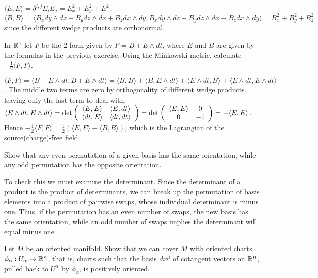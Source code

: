 $\langle E,E\rangle=\delta^{i,j}E_i E_j=E_x^2+E_y^2+E_z^2$.  $\langle B,B\rangle=\langle B_x dy\wedge dz+B_y dz\wedge dx+B_z dx\wedge dy,
B_x dy\wedge dz+B_y dz\wedge dx+B_z dx\wedge dy\rangle= B_x^2+B_y^2+B_z^2$ since the different wedge products are orthonormal.\\

\begin{p}{In $\mathbb{R}^4$ let $F$ be the 2-form given by $F=B+E\wedge dt$, where $E$ and $B$ are given by the formulas
in the previous exercise. Using the Minkowski metric, calculate $-\frac{1}{2}\langle F,F\rangle$.}\end{p}

$\langle F,F\rangle=\langle B+E\wedge dt,B+E\wedge dt\rangle=\langle B,B\rangle+\langle B,E\wedge dt\rangle+\langle E\wedge dt,B\rangle
+\langle E\wedge dt,E\wedge dt\rangle$. The middle two terms are zero by orthogonality of different wedge products, leaving only the
last term to deal with. $\langle E\wedge dt,E\wedge dt\rangle={\rm det}\left(\begin{array}{cc}\langle E,E\rangle & \langle E,dt\rangle\\
\langle dt,E\rangle & \langle dt,dt\rangle\end{array}\right)={\rm det}\left(\begin{array}{cc}\langle E,E\rangle & 0\\
0 &-1\end{array}\right)=-\langle E,E\rangle$. Hence $-\frac{1}{2}\langle F,F\rangle=\frac{1}{2}(\langle E,E\rangle-\langle B,B\rangle)$,
which is the Lagrangian of the source(charge)-free field.\\

\begin{p}{Show that any even permutation of a given basis has the same orientation, while any odd permutation has the
opposite orientation.}
\end{p}

To check this we must examine the determinant. Since the determinant of a product is the product of determinants, we can
break up the permutation of basis elements into a product of pairwise swaps, whose individual determinant is minus one. Thus,
if the permutation has an even number of swaps, the new basis has the same orientation, while an odd number of swaps 
implies the determinant will equal minus one.

\begin{p}{Let $M$ be an oriented manifold. Show that we can cover $M$ with oriented charts $\phi_\alpha:U_\alpha\rightarrow\mathbb{R}^n$, that is,
charts such that the basis $dx^\mu$ of cotangent vectors on $\mathbb{R}^n$, pulled back to $U^\alpha$ by $\phi_\alpha$, is positively
oriented.}
\end{p}

